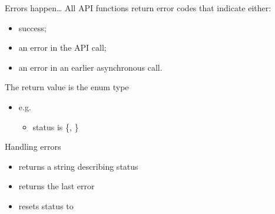 \documentclass[aspectratio=43]{beamer}
\begin{document}
\begin{frame}[fragile]{}

    \begin{info}{Errors happen\ldots}
        All API functions return error codes that indicate either:
        \begin{itemize}
            \item success;
            \item an error in the API call;
            \item an error in an earlier asynchronous call.
        \end{itemize}
        The return value is the enum type 
        \begin{itemize}
            \item e.g. 
            \begin{itemize}
                \item status is \{, \}
            \end{itemize}
        \end{itemize}
    \end{info}

    \begin{info}{Handling errors}
        \centering {}
        \begin{itemize}
            \item returns a string describing status
        \end{itemize}
        \centering {}
        \begin{itemize}
            \item returns the last error
            \item resets status to 
        \end{itemize}
    \end{info}

\end{frame}
\end{document}
